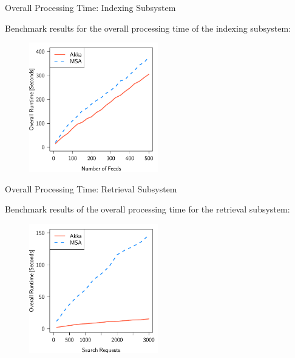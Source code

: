 \documentclass{beamer}
\begin{document}
\begin{frame}{Overall Processing Time: Indexing Subsystem}

Benchmark results for the overall processing time of the indexing subsystem:

\begin{center}
  \begin{figure} 
    \includegraphics[width=0.5\textwidth]{graphics/eval-index-overall.pdf} 
  \end{figure}
\end{center}

\end{frame}


\begin{frame}{Overall Processing Time: Retrieval Subsystem}

Benchmark results of the overall processing time for the retrieval subsystem:

\begin{center}
  \begin{figure} 
    \includegraphics[width=0.5\textwidth]{graphics/eval-search-rtt-overall.pdf} 
  \end{figure}
\end{center}

\end{frame}
\end{document}
